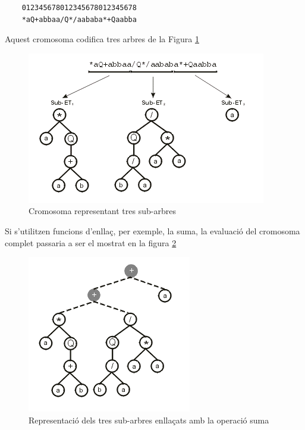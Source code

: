 	\begin{center}
	\begin{verbatim}
	012345678012345678012345678 	 
	*aQ+abbaa/Q*/aababa*+Qaabba
	\end{verbatim}
	\end{center}


Aquest cromosoma codifica tres arbres de la Figura \ref{fig:tres sub-et}

\begin{figure}[h!]
\begin{center}
\includegraphics{geptut/pt03a.png}
\end{center}
\caption{Cromosoma representant tres sub-arbres}
\label{fig:tres sub-et}
\end{figure}

Si s'utilitzen funcions d'enllaç, per exemple, la suma, la evaluació del
cromosoma complet passaria a ser el mostrat en la figura 
\ref{fig:tres sub-et amb link}

\begin{figure}[h!]
\begin{center}
\includegraphics{geptut/pt03b.png}
\end{center}
\caption{Representació dels tres sub-arbres enllaçats amb la operació suma}
\label{fig:tres sub-et amb link}
\end{figure}


